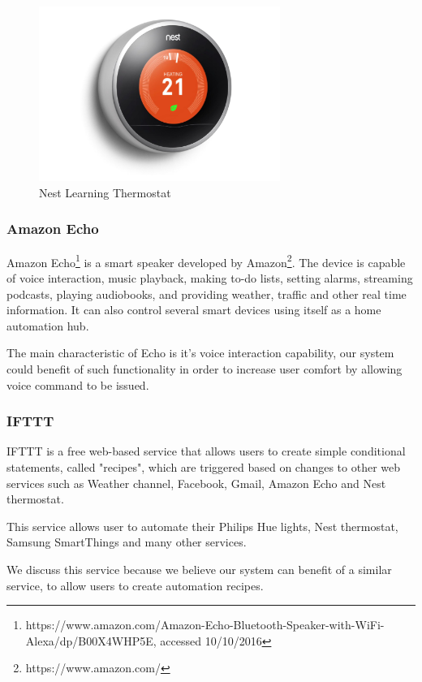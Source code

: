 \begin{figure}[h]
\centering
\includegraphics[width=0.7\textwidth]{Figures/nest}
\caption{Nest Learning Thermostat}
\label{fig:nest}
\end{figure}


\subsubsection{Amazon Echo}
Amazon Echo\footnote{https://www.amazon.com/Amazon-Echo-Bluetooth-Speaker-with-WiFi-Alexa/dp/B00X4WHP5E, accessed 10/10/2016} is a smart speaker developed by Amazon\footnote{https://www.amazon.com/}. The device is capable of voice interaction, music playback, making to-do lists, setting alarms, streaming podcasts, playing audiobooks, and providing weather, traffic and other real time information. It can also control several smart devices using itself as a home automation hub.

The main characteristic of Echo is it's voice interaction capability, our system could benefit of such functionality in order to increase user comfort by allowing voice command to be issued.


\subsubsection{IFTTT}

IFTTT is a free web-based service that allows users to create simple conditional statements, called "recipes", which are triggered based on changes to other web services such as Weather channel, Facebook, Gmail, Amazon Echo and Nest thermostat. 

This service allows user to automate their Philips Hue lights, Nest thermostat, Samsung SmartThings and many other services.

We discuss this service because we believe our system can benefit of a similar service, to allow users to create automation recipes.


